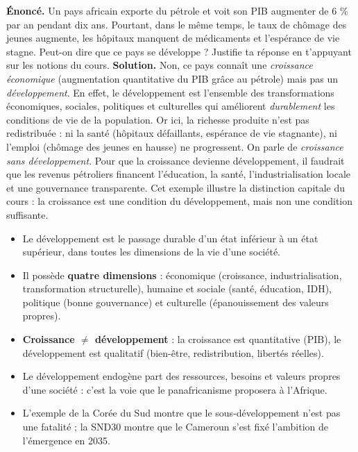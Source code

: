\documentclass[11pt]{article}
\newcommand{\cle}[1]{{\popxbold\color{popdark}#1}}
\begin{document}
\begin{exoresolu}
\textbf{Énoncé.} Un pays africain exporte du pétrole et voit son PIB augmenter de 6 \% par an pendant dix ans. Pourtant, dans le même temps, le taux de chômage des jeunes augmente, les hôpitaux manquent de médicaments et l'espérance de vie stagne. Peut-on dire que ce pays se développe ? Justifie ta réponse en t'appuyant sur les notions du cours.
\tcblower
\textbf{Solution.} Non, ce pays connaît une \emph{croissance économique} (augmentation quantitative du PIB grâce au pétrole) mais pas un \emph{développement}. En effet, le développement est l'ensemble des transformations économiques, sociales, politiques et culturelles qui améliorent \emph{durablement} les conditions de vie de la population. Or ici, la richesse produite n'est pas redistribuée : ni la santé (hôpitaux défaillants, espérance de vie stagnante), ni l'emploi (chômage des jeunes en hausse) ne progressent. On parle de \emph{croissance sans développement}. Pour que la croissance devienne développement, il faudrait que les revenus pétroliers financent l'éducation, la santé, l'industrialisation locale et une gouvernance transparente. Cet exemple illustre la distinction capitale du cours : la croissance est une condition du développement, mais non une condition suffisante.
\end{exoresolu}

\begin{aretenir}
\begin{itemize}
\item Le \cle{développement} est le passage durable d'un état inférieur à un état supérieur, dans toutes les dimensions de la vie d'une société.
\item Il possède \textbf{quatre dimensions} : économique (croissance, industrialisation, transformation structurelle), humaine et sociale (santé, éducation, IDH), politique (bonne gouvernance) et culturelle (épanouissement des valeurs propres).
\item \textbf{Croissance $\neq$ développement} : la croissance est quantitative (PIB), le développement est qualitatif (bien-être, redistribution, libertés réelles).
\item Le \cle{développement endogène} part des ressources, besoins et valeurs propres d'une société : c'est la voie que le panafricanisme proposera à l'Afrique.
\item L'exemple de la Corée du Sud montre que le sous-développement n'est pas une fatalité ; la SND30 montre que le Cameroun s'est fixé l'ambition de l'émergence en 2035.
\end{itemize}
\end{aretenir}
\end{document}
